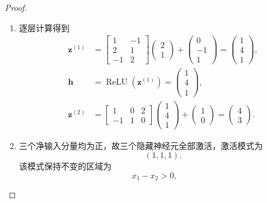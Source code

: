 \begin{proof}
    \begin{enumerate}
        \item 逐层计算得到
        \[
        \begin{aligned}
            \bm{z}^{(1)}
            &= \begin{bmatrix}
                1 & -1 \\
                2 & 1 \\
                -1 & 2
               \end{bmatrix}
               \begin{pmatrix}2\\1\end{pmatrix}
               +\begin{pmatrix}0\\-1\\1\end{pmatrix}
             = \begin{pmatrix}1\\4\\1\end{pmatrix},\\
            \bm{h}
            &= \operatorname{ReLU}(\bm{z}^{(1)})
             = \begin{pmatrix}1\\4\\1\end{pmatrix},\\
            \bm{z}^{(2)}
            &= \begin{bmatrix}1&0&2\\-1&1&0\end{bmatrix}
               \begin{pmatrix}1\\4\\1\end{pmatrix}
               +\begin{pmatrix}1\\0\end{pmatrix}
             = \boxed{\begin{pmatrix}4\\3\end{pmatrix}}.
        \end{aligned}
        \]
        \item 三个净输入分量均为正，故三个隐藏神经元全部激活，激活模式为
        \[
            \boxed{(1,1,1)}.
        \]
        该模式保持不变的区域为
        \[
            x_1-x_2>0,\qquad
\]
\end{enumerate}
\end{proof}
